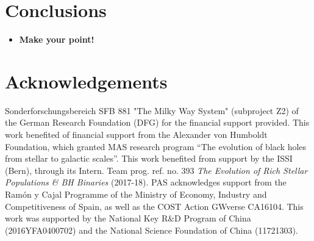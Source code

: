 \documentclass[twocolumn]{aastex62}
\begin{document}
\section{Conclusions}

\begin{itemize}
\item {\bf Make your point!}
\end{itemize}

\section*{Acknowledgements}

Sonderforschungsbereich SFB 881 "The Milky Way System" (subproject Z2) of the
German Research Foundation (DFG) for the financial support provided. This work
benefited of financial support from the Alexander von Humboldt Foundation,
which granted MAS research program ``The evolution of black holes from stellar
to galactic scales''.  This work benefited from support by the ISSI (Bern),
through its Intern. Team prog. ref. no. 393 {\it The Evolution of Rich Stellar
Populations \& BH Binaries} (2017-18).  PAS acknowledges support from the
Ram{\'o}n y Cajal Programme of the Ministry of Economy, Industry and
Competitiveness of Spain, as well as the COST Action GWverse CA16104. This work
was supported by the National Key R\&D Program of China (2016YFA0400702) and
the National Science Foundation of China (11721303).


\footnotesize{


}
\end{document}
